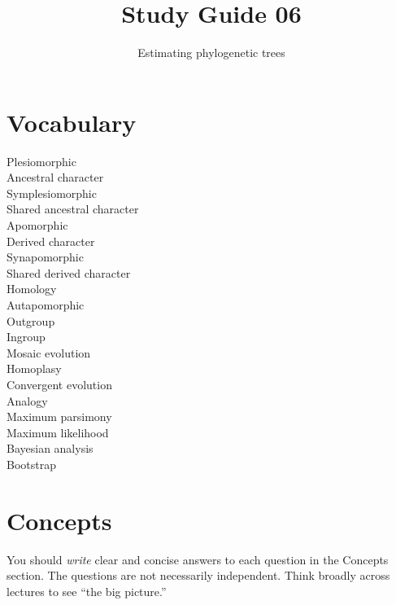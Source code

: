\documentclass[letterpaper]{tufte-handout}
\title{Study Guide 06\hfill}
\author{Estimating phylogenetic trees}
\date{} %
\begin{document}
\maketitle	%

\section{Vocabulary}

\begin{multicols}{2}
Plesiomorphic\\
Ancestral character \\
Symplesiomorphic \\
Shared ancestral character \\
Apomorphic \\
Derived character \\
Synapomorphic \\
Shared derived character \\
Homology \\
Autapomorphic \\
Outgroup \\
Ingroup \\
Mosaic evolution \\
Homoplasy \\
Convergent evolution \\
Analogy \\
Maximum parsimony \\
Maximum likelihood \\
Bayesian analysis \\
Bootstrap \\
\end{multicols}


\section{Concepts}

You should \emph{write} clear and concise answers to each question in the Concepts section.  The questions are not necessarily independent.  Think broadly across lectures to see ``the big picture.'' 
\end{document}
